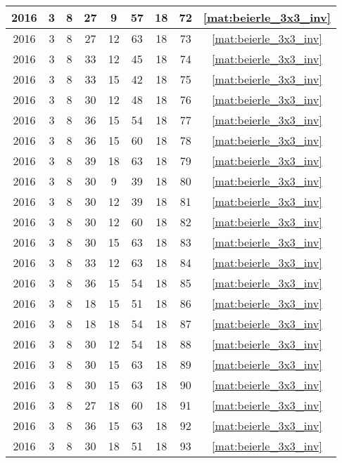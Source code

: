 \begin{longtable}{|c|c|c|c|c|c|c|c|c|}
2016 & 3 & 8 & 27 & 9 & 57 & 18 & 72 & \eqref{mat:beierle_3x3_inv} \\ \hline 
2016 & 3 & 8 & 27 & 12 & 63 & 18 & 73 & \eqref{mat:beierle_3x3_inv} \\ \hline 
2016 & 3 & 8 & 33 & 12 & 45 & 18 & 74 & \eqref{mat:beierle_3x3_inv} \\ \hline 
2016 & 3 & 8 & 33 & 15 & 42 & 18 & 75 & \eqref{mat:beierle_3x3_inv} \\ \hline 
2016 & 3 & 8 & 30 & 12 & 48 & 18 & 76 & \eqref{mat:beierle_3x3_inv} \\ \hline 
2016 & 3 & 8 & 36 & 15 & 54 & 18 & 77 & \eqref{mat:beierle_3x3_inv} \\ \hline 
2016 & 3 & 8 & 36 & 15 & 60 & 18 & 78 & \eqref{mat:beierle_3x3_inv} \\ \hline 
2016 & 3 & 8 & 39 & 18 & 63 & 18 & 79 & \eqref{mat:beierle_3x3_inv} \\ \hline 
2016 & 3 & 8 & 30 & 9 & 39 & 18 & 80 & \eqref{mat:beierle_3x3_inv} \\ \hline 
2016 & 3 & 8 & 30 & 12 & 39 & 18 & 81 & \eqref{mat:beierle_3x3_inv} \\ \hline 
2016 & 3 & 8 & 30 & 12 & 60 & 18 & 82 & \eqref{mat:beierle_3x3_inv} \\ \hline 
2016 & 3 & 8 & 30 & 15 & 63 & 18 & 83 & \eqref{mat:beierle_3x3_inv} \\ \hline 
2016 & 3 & 8 & 33 & 12 & 63 & 18 & 84 & \eqref{mat:beierle_3x3_inv} \\ \hline 
2016 & 3 & 8 & 36 & 15 & 54 & 18 & 85 & \eqref{mat:beierle_3x3_inv} \\ \hline 
2016 & 3 & 8 & 18 & 15 & 51 & 18 & 86 & \eqref{mat:beierle_3x3_inv} \\ \hline 
2016 & 3 & 8 & 18 & 18 & 54 & 18 & 87 & \eqref{mat:beierle_3x3_inv} \\ \hline 
2016 & 3 & 8 & 30 & 12 & 54 & 18 & 88 & \eqref{mat:beierle_3x3_inv} \\ \hline 
2016 & 3 & 8 & 30 & 15 & 63 & 18 & 89 & \eqref{mat:beierle_3x3_inv} \\ \hline 
2016 & 3 & 8 & 30 & 15 & 63 & 18 & 90 & \eqref{mat:beierle_3x3_inv} \\ \hline 
2016 & 3 & 8 & 27 & 18 & 60 & 18 & 91 & \eqref{mat:beierle_3x3_inv} \\ \hline 
2016 & 3 & 8 & 36 & 15 & 63 & 18 & 92 & \eqref{mat:beierle_3x3_inv} \\ \hline 
2016 & 3 & 8 & 30 & 18 & 51 & 18 & 93 & \eqref{mat:beierle_3x3_inv} \\ \hline 

\end{longtable}
